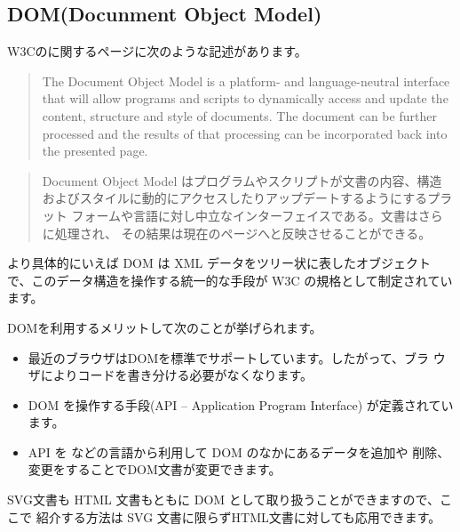 \subsection{DOM(Docunment Object Model)}
W3Cのに関するページ\cite{DOM}に次のような記述があります。
\begin{quotation}
The Document Object Model is a platform- and language-neutral interface
 that will allow programs and scripts to dynamically access and update
 the content, structure and style of documents. The document can be
 further processed and the results of that processing can be
 incorporated back into the presented page. 
\end{quotation}
\begin{quotation}
  Document Object Model はプログラムやスクリプトが文書の内容、構造
 およびスタイルに動的にアクセスしたりアップデートするようにするプラット
 フォームや言語に対し中立なインターフェイスである。文書はさらに処理され、
 その結果は現在のページへと反映させることができる。
\end{quotation}
より具体的にいえば DOM は
XML データをツリー状に表したオブジェクトで、このデータ構造を操作する統一的な手段が
 W3C の規格として制定されています。

DOMを利用するメリットして次のことが挙げられます。
\begin{itemize}
 \item 最近のブラウザはDOMを標準でサポートしています。したがって、ブラ
       ウザによりコードを書き分ける必要がなくなります。
 \item DOM を操作する手段(API -- Application Program Interface)
       が定義されています。
 \item API を \JS などの言語から利用して DOM のなかにあるデータを追加や
       削除、変更をすることでDOM文書が変更できます。
\end{itemize}
SVG文書も HTML 文書もともに DOM として取り扱うことができますので、ここで
紹介する方法は SVG 文書に限らずHTML文書に対しても応用できます。

